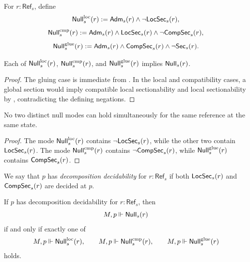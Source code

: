 \begin{definition}\label{def:null-failure-modes}
For $r:\mathsf{Ref}_s$, define
\[
\mathsf{Null}^{\mathrm{loc}}_s(r):=\mathsf{Adm}_s(r)\land \neg\mathsf{LocSec}_s(r),
\]
\[
\mathsf{Null}^{\mathrm{cmp}}_s(r):=\mathsf{Adm}_s(r)\land \mathsf{LocSec}_s(r)\land \neg\mathsf{CompSec}_s(r),
\]
\[
\mathsf{Null}^{\mathrm{glue}}_s(r):=\mathsf{Adm}_s(r)\land \mathsf{CompSec}_s(r)\land \neg\mathsf{Sec}_s(r).
\]
\end{definition}

\begin{proposition}\label{prop:null-modes-imply-null}
Each of $\mathsf{Null}^{\mathrm{loc}}_s(r)$, $\mathsf{Null}^{\mathrm{cmp}}_s(r)$, and $\mathsf{Null}^{\mathrm{glue}}_s(r)$ implies $\mathsf{Null}_s(r)$.
\end{proposition}

\begin{proof}
The gluing case is immediate from . In the local and compatibility cases, a global section would imply compatible local sectionability and local sectionability by , contradicting the defining negations.
\end{proof}

\begin{proposition}\label{prop:null-modes-exclusive}
No two distinct null modes can hold simultaneously for the same reference at the same state.
\end{proposition}

\begin{proof}
The mode $\mathsf{Null}^{\mathrm{loc}}_s(r)$ contains $\neg\mathsf{LocSec}_s(r)$, while the other two contain $\mathsf{LocSec}_s(r)$. The mode $\mathsf{Null}^{\mathrm{cmp}}_s(r)$ contains $\neg\mathsf{CompSec}_s(r)$, while $\mathsf{Null}^{\mathrm{glue}}_s(r)$ contains $\mathsf{CompSec}_s(r)$.
\end{proof}

\begin{definition}\label{def:decomposition-decidability}
We say that $p$ has \emph{decomposition decidability} for $r:\mathsf{Ref}_s$ if both $\mathsf{LocSec}_s(r)$ and $\mathsf{CompSec}_s(r)$ are decided at $p$.
\end{definition}

\begin{proposition}\label{prop:null-trichotomy}
If $p$ has decomposition decidability for $r:\mathsf{Ref}_s$, then
\[
M,p\Vdash \mathsf{Null}_s(r)
\]
if and only if exactly one of
\[
M,p\Vdash \mathsf{Null}^{\mathrm{loc}}_s(r),\qquad
M,p\Vdash \mathsf{Null}^{\mathrm{cmp}}_s(r),\qquad
M,p\Vdash \mathsf{Null}^{\mathrm{glue}}_s(r)
\]
holds.
\end{proposition}

